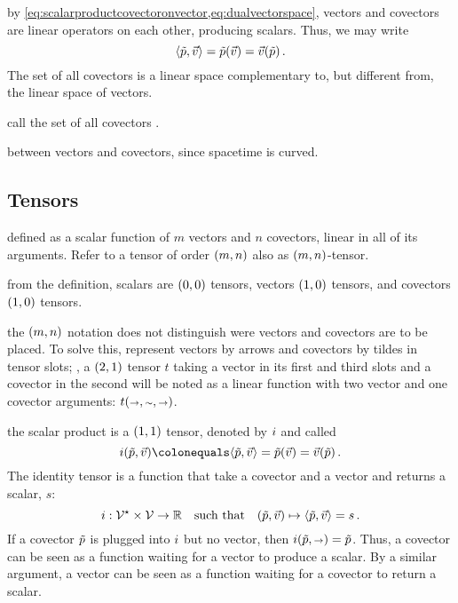  by \cref{eq:scalarproductcovectoronvector,eq:dualvectorspace}, vectors and covectors are linear operators on each other, producing scalars. Thus, we may write
%
\begin{equation*}
  \sprod{\cov p}{\vec v} = \cov p\vat{\vec v}
                         = \vec v\vat{\cov p}\,.
\end{equation*}
%
The set of all covectors is a linear space complementary to, but different from, the linear space of vectors.

 call the set of all covectors .

 between vectors and covectors, since spacetime is curved.


\subsection{Tensors}
%
 defined as a scalar function of $m$ vectors and $n$ covectors, linear in all of its arguments. Refer to a tensor of order $\torder mn$ also as $\torder mn$-tensor.

 from the definition, scalars are $\torder 00$ tensors, vectors $\torder 10$ tensors, and covectors $\torder 10$ tensors.

 the $\torder mn$ notation does not distinguish were vectors and covectors are to be placed. To solve this, represent vectors by arrows and covectors by tildes in tensor slots; \eg, a $\torder 21$ tensor $t$ taking a vector in its first and third slots and a covector in the second will be noted as a linear function with two vector and one covector arguments: $t\vat{\vslot,\cslot,\vslot}$.

 the scalar product is a $\torder 11$ tensor, denoted by $i$ and called 
%
\begin{equation}\label{eq:identitytensordefinition}
  \idtens\vat{\cov p, \vec v} \defas \sprod{\cov p}{\vec v}
                              = \cov p\vat{\vec v}
                              = \vec v\vat{\cov p}\,.
\end{equation}
%
The identity tensor is a function that take a covector and a vector and returns a scalar, $s$:
%
\begin{equation*}
  \fdef{\idtens}{\dlspace V\setprod\lspace V}{\rspace}\suchthat
  \fmap{\tuple{\cov p,\vec v}}{\sprod{\cov p}{\vec v} = s}\,.
\end{equation*}
%
If a covector $\tilde{p}$ is plugged into $i$ but no vector, then $\idtens\vat{\cov p, \vslot} = \cov p$. Thus, a covector can be seen as a function waiting for a vector to produce a scalar. By a similar argument, a vector can be seen as a function waiting for a covector to return a scalar.

